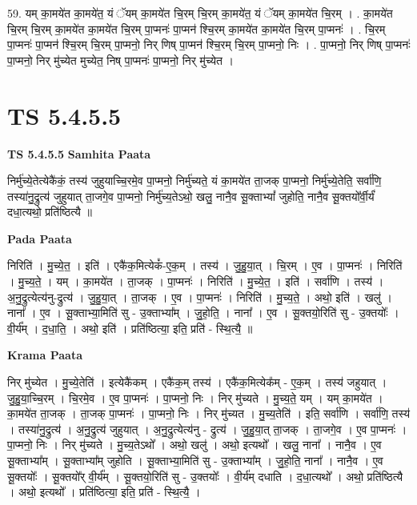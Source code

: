 \documentclass[17pt]{extarticle}
\begin{document}
59. यम् का॒मये॑त का॒मये॑त॒ यं ॅयम् का॒मये॑त चि॒रम् चि॒रम् का॒मये॑त॒ यं ॅयम् का॒मये॑त चि॒रम् । . का॒मये॑त चि॒रम् चि॒रम् का॒मये॑त का॒मये॑त चि॒रम् पा॒प्मनः॑ पा॒प्मन॑ श्चि॒रम् का॒मये॑त का॒मये॑त चि॒रम् पा॒प्मनः॑ । . चि॒रम् पा॒प्मनः॑ पा॒प्मन॑ श्चि॒रम् चि॒रम् पा॒प्मनो॒ निर् णिष् पा॒प्मन॑ श्चि॒रम् चि॒रम् पा॒प्मनो॒ निः । . पा॒प्मनो॒ निर् णिष् पा॒प्मनः॑ पा॒प्मनो॒ निर् मु॑च्येत मुच्येत॒ निष् पा॒प्मनः॑ पा॒प्मनो॒ निर् मु॑च्येत । \newline
\pagebreak
{}

\section{ TS 5.4.5.5 }

\textbf{TS 5.4.5.5 } \newline
\textbf{Samhita Paata} \newline

निर्मु॑च्ये॒तेत्येकै॑कं॒ तस्य॑ जुहुयाच्चि॒रमे॒व पा॒प्मनो॒ निर्मु॑च्यते॒ यं का॒मये॑त ता॒जक् पा॒प्मनो॒ निर्मु॑च्ये॒तेति॒ सर्वा॑णि॒ तस्या॑नु॒द्रुत्य॑ जुहुयात् ता॒जगे॒व पा॒प्मनो॒ निर्मु॑च्य॒तेऽथो॒ खलु॒ नानै॒व सू॒क्ताभ्यां᳚ जुहोति॒ नानै॒व सू॒क्तयो᳚र्वी॒र्यं॑ दधा॒त्यथो॒ प्रति॑ष्ठित्यै ॥ \newline

\textbf{Pada Paata} \newline

निरिति॑ । मु॒च्ये॒त॒ । इति॑ । एकै॑क॒मित्येकं᳚-ए॒क॒म् । तस्य॑ । जु॒हु॒या॒त् । चि॒रम् । ए॒व । पा॒प्मनः॑ । निरिति॑ । मु॒च्य॒ते॒ । यम् । का॒मये॑त । ता॒जक् । पा॒प्मनः॑ । निरिति॑ । मु॒च्ये॒त॒ । इति॑ । सर्वा॑णि । तस्य॑ । अ॒नु॒द्रुत्येत्य॑नु-द्रुत्य॑ । जु॒हु॒या॒त् । ता॒जक् । ए॒व । पा॒प्मनः॑ । निरिति॑ । मु॒च्य॒ते॒ । अथो॒ इति॑ । खलु॑ । नाना᳚ । ए॒व । सू॒क्ताभ्या॒मिति॑ सु - उ॒क्ताभ्या᳚म् । जु॒हो॒ति॒ । नाना᳚ । ए॒व । सू॒क्तयो॒रिति॑ सु - उ॒क्तयोः᳚ । वी॒र्य᳚म् । द॒धा॒ति॒ । अथो॒ इति॑ । प्रति॑ष्ठित्या॒ इति॒ प्रति॑ - स्थि॒त्यै॒ ॥  \newline


\textbf{Krama Paata} \newline

निर् मु॑च्येत । मु॒च्ये॒तेति॑ । इत्येकै॑कम् । एकै॑क॒म् तस्य॑ । एकै॑क॒मित्येक᳚म् - ए॒क॒म् । तस्य॑ जहुयात् । जु॒हु॒या॒च्चि॒रम् । चि॒रमे॒व । ए॒व पा॒प्मनः॑ । पा॒प्मनो॒ निः । निर् मु॑च्यते । मु॒च्य॒ते॒ यम् । यम् का॒मये॑त । का॒मये॑त ता॒जक् । ता॒जक् पा॒प्मनः॑ । पा॒प्मनो॒ निः । निर् मु॑च्यत । मु॒च्य॒तेति॑ । इति॒ सर्वा॑णि । सर्वा॑णि॒ तस्य॑ । तस्या॑नु॒द्रुत्य॑ । अ॒नु॒द्रुत्य॑ जुहुयात् । अ॒नु॒द्रुत्येत्य॑नु - द्रुत्य॑ । जु॒हु॒या॒त् ता॒जक् । ता॒जगे॒व । ए॒व पा॒प्मनः॑ । पा॒प्मनो॒ निः । निर् मु॑च्यते । मु॒च्य॒तेऽथो᳚ । अथो॒ खलु॑ । अथो॒ इत्यथो᳚ । खलु॒ नाना᳚ । नानै॒व । ए॒व सू॒क्ताभ्या᳚म् । सू॒क्ताभ्या᳚म् जुहोति । सू॒क्ताभ्या॒मिति॑ सु - उ॒क्ताभ्या᳚म् । जु॒हो॒ति॒ नाना᳚ । नानै॒व । ए॒व सू॒क्तयोः᳚ । सू॒क्तयो᳚र् वी॒र्य᳚म् । सू॒क्तयो॒रिति॑ सु - उ॒क्तयोः᳚ । वी॒र्य॑म् दधाति । द॒धा॒त्यथो᳚ । अथो॒ प्रति॑ष्ठित्यै । अथो॒ इत्यथो᳚ । प्रति॑ष्ठित्या॒ इति॒ प्रति॑ - स्थि॒त्यै॒ । \newline
\end{document}

